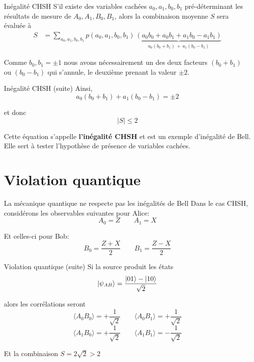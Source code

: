 \documentclass[aspectratio=169,12pt]{beamer}
\begin{document}
\begin{frame}{Inégalité CHSH}
  S'il existe des variables cachées $a_0,a_1,b_0,b_1$ pré-déterminant les résultats de mesure de $A_0,A_1,B_0,B_1$, alors la combinaison moyenne $S$ sera évaluée à
  \begin{align*}
    S &= \sum_{a_0,a_1,b_0,b_1} p(a_0,a_1,b_0,b_1) \, \underbrace{(a_0b_0+ a_0b_1 + a_1b_0 - a_1b_1)}_{a_0(b_0+b_1) \, + \, a_1(b_0-b_1)}
  \end{align*}
  
  Comme $b_0,b_1 = \pm 1$ nous avons nécessairement un des deux facteurs $(b_0+b_1)$ ou $(b_0-b_1)$ qui s'annule, le deuxième prenant la valeur $\pm 2$.
\end{frame}

\begin{frame}{Inégalité CHSH (suite)}
  Ainsi,
  \[
    a_0(b_0+b_1) + a_1(b_0-b_1) = \pm 2
  \]
  
  et donc
  \[
    |S| \le 2
  \]
  
  \bigskip
  Cette équation s'appelle \textbf{l'inégalité CHSH} et est un exemple d'inégalité de Bell. Elle sert à tester l'hypothèse de présence de variables cachées.
\end{frame}

\section{Violation quantique}

\begin{frame}{La mécanique quantique ne respecte pas les inégalités de Bell}
  Dans le cas CHSH, considérons les observables suivantes pour Alice:
  \[
    A_0 = Z
    \qquad
    A_1 = X
  \]
  
  Et celles-ci pour Bob:
  \[
    B_0 = \frac{Z+X}{2}
    \qquad
    B_1 = \frac{Z-X}{2}
  \]
\end{frame}

\begin{frame}{Violation quantique (suite)}
  Si la source produit les états
  \[
    \ket{\psi_{AB}} = \frac{\ket{01} - \ket{10}}{\sqrt{2}}
  \]
  
  alors les corrélations seront
  \[
    \langle A_0B_0 \rangle = +\frac{1}{\sqrt{2}} \qquad
    \langle A_0B_1 \rangle = +\frac{1}{\sqrt{2}}
  \]
  \[
    \langle A_1B_0 \rangle = +\frac{1}{\sqrt{2}} \qquad
    \langle A_1B_1 \rangle = -\frac{1}{\sqrt{2}}
  \]
  
  Et la combinaison $S = 2\sqrt{2} > 2$
\end{frame}
\end{document}
